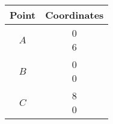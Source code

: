 \begin{tabular}{|c|c|}
        \hline
        Point & Coordinates\\
        \hline
        $A$ & \myvec{0\\6}\\
        \hline
        $B$ & \myvec{0\\0}\\
        \hline
        $C$ & \myvec{8\\0}\\
        \hline
\end{tabular}

